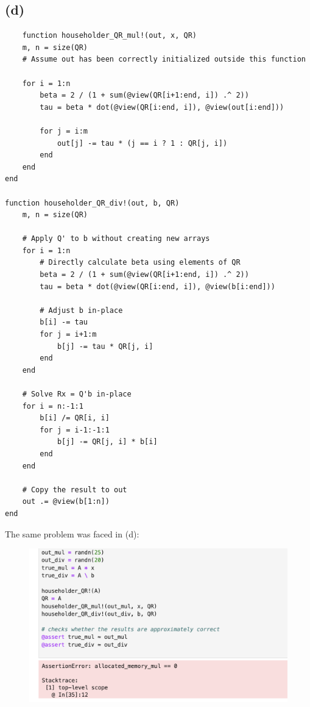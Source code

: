 \documentclass{article}
\begin{document}
\subsection{(d)}
\begin{verbatim}
    function householder_QR_mul!(out, x, QR)
    m, n = size(QR)
    # Assume out has been correctly initialized outside this function
    
    for i = 1:n
        beta = 2 / (1 + sum(@view(QR[i+1:end, i]) .^ 2))
        tau = beta * dot(@view(QR[i:end, i]), @view(out[i:end]))
        
        for j = i:m
            out[j] -= tau * (j == i ? 1 : QR[j, i])
        end
    end
end

function householder_QR_div!(out, b, QR)
    m, n = size(QR)
    
    # Apply Q' to b without creating new arrays
    for i = 1:n
        # Directly calculate beta using elements of QR
        beta = 2 / (1 + sum(@view(QR[i+1:end, i]) .^ 2))
        tau = beta * dot(@view(QR[i:end, i]), @view(b[i:end]))
        
        # Adjust b in-place
        b[i] -= tau
        for j = i+1:m
            b[j] -= tau * QR[j, i]
        end
    end
    
    # Solve Rx = Q'b in-place
    for i = n:-1:1
        b[i] /= QR[i, i]
        for j = i-1:-1:1
            b[j] -= QR[j, i] * b[i]
        end
    end
    
    # Copy the result to out
    out .= @view(b[1:n])
end
\end{verbatim}
The same problem was faced in (d):
\begin{figure}[H]
    \centering
    \includegraphics[width=0.75\linewidth]{Screenshot 2024-03-05 at 01.22.17.png}
    
\end{figure}
\end{document}
